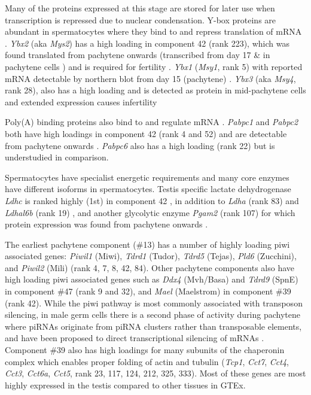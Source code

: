Many of the proteins expressed at this stage are stored for later use when transcription is repressed due to nuclear condensation. Y-box proteins are abundant in spermatocytes where they bind to and repress translation of mRNA \parencite[reviewed in][]{Kleene2016Positiondependent}. \textit{Ybx2} (aka \textit{Mys2}) has a high loading in component 42 (rank 223), which was found translated from pachytene onwards \parencite{Kwon1993Proteins, Oko1996Germ} (transcribed from day 17 \& in pachytene cells \parencite{Gu1998Mammalian}) and is required for fertility \parencite{Yang2005Absence}. \textit{Ybx1} (\textit{Msy1}, rank 5) with reported mRNA detectable by northern blot from day 15 (pachytene) \parencite{Tafuri1993mouse}. \textit{Ybx3} (aka \textit{Msy4}, rank 28), also has a high loading and is detected as protein in mid-pachytene cells \parencite{Davies2000SequenceSpecific} and extended expression causes infertility \parencite{Giorgini2002Translational}

Poly(A) binding proteins also bind to and regulate mRNA \parencite[reviewed in][]{Ozturk2018Potential}. \textit{Pabpc1} and \textit{Pabpc2} both have high loadings in component 42 (rank 4 and 52) and are detectable from pachytene onwards \parencite{C.Kleene1994Developmental, Gu1995Poly, Kleene1998Mouse, Lee2000Expression, Kimura2009Characterization}. \textit{Pabpc6} also has a high loading (rank 22) but is understudied in comparison.

Spermatocytes have specialist energetic requirements and many core enzymes have different isoforms in spermatocytes. Testis specific lactate dehydrogenase \textit{Ldhc} is ranked highly (1st) in component 42 \parencite{Goldberg1963Lactic, Blanco1963Lactate, Goldberg2010LDHC}, in addition to \textit{Ldha} (rank 83) and \textit{Ldhal6b} (rank 19) \parencite{Wang2005Cloning}, and another glycolytic enzyme \textit{Pgam2} (rank 107) for which protein expression was found from pachytene onwards \parencite{Fundele1987Developmental}.

The earliest pachytene component (\#13) has a number of highly loading piwi associated genes: \textit{Piwil1} (Miwi), \textit{Tdrd1} (Tudor), \textit{Tdrd5} (Tejas), \textit{Pld6} (Zucchini), and \textit{Piwil2} (Mili) (rank 4, 7, 8, 42, 84). Other pachytene components also have high loading piwi associated genes such as \textit{Ddx4} (Mvh/Basa) and \textit{Tdrd9} (SpnE) in component \#47 (rank 9 and 32), and \textit{Mael} (Maelstrom) in component \#39 (rank 42). While the piwi pathway is most commonly associated with transposon silencing, in male germ cells there is a second phase of activity during pachytene where piRNAs originate from piRNA clusters rather than transposable elements, and have been proposed to direct transcriptional silencing of mRNAs \parencite{Gou2014Pachytene, Iwasaki2015PIWIInteracting}. Component \#39 also has high loadings for many subunits of the chaperonin complex which enables proper folding of actin and tubulin \parencite{Dun2012role} (\textit{Tcp1}, \textit{Cct7}, \textit{Cct4}, \textit{Cct3}, \textit{Cct6a}, \textit{Cct5}, rank 23, 117, 124, 212, 325, 333). Most of these genes are most highly expressed in the testis compared to other tissues in GTEx.

